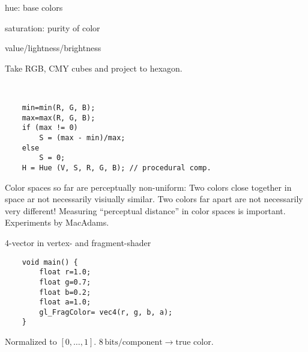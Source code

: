 \begin{compactdesc}
\begin{enumerate*}[label=\protect\circled{\arabic*},itemjoin=]
		\item hue: base colors\\
		\item saturation: purity of color\\
		\item value/lightness/brightness\\
	\end{enumerate*}
	Take RGB, CMY cubes and project to hexagon.
\item[\lp{Conversion procedure RGB$\to$HSV}] \hfill\\
	\begin{lstlisting}
	min=min(R, G, B);
	max=max(R, G, B);
	if (max != 0)
		S = (max - min)/max;
	else
		S = 0;
	H = Hue (V, S, R, G, B); // procedural comp.
	\end{lstlisting}
\item[\lp{Perceptually-Uniform Color Spaces}] Color spaces so far are perceptually non-uniform: Two colors close together in space ar not necessarily visiually similar. Two colors far apart are not necessarily very different! Measuring ``perceptual distance'' in color spaces is important. Experiments by MacAdams.
\item[\lp{MacAdamns color ellipses}]
\item[\lp{CIELAB and CIELUV Color Spaces}]
\item[\lp{OpenGL Color}] 4-vector in vertex- and fragment-shader
	\begin{lstlisting}
	void main() {
		float r=1.0;
		float g=0.7;
		float b=0.2;
		float a=1.0;
		gl_FragColor= vec4(r, g, b, a);
	}
	\end{lstlisting}
	Normalized to $[0,\ldots,1]$. $8\,\text{bits}/\text{component}\to\text{true color}$.
\end{compactdesc}
